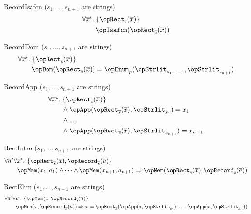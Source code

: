 \documentclass[11pt, a4paper, oneside]{article}
\begin{document}
\begin{axioms}
\item[RecordIsafcn (\rm$s_1,\dots,s_{n+1}$ are strings)] \[
        \begin{aligned}
            &\forall \overline{x}^\idv.\, \st{ \opRect_{\overline{s}}(\overline{x}) } \\
            &\qquad \opIsafcn(\opRect_{\overline{s}}(\overline{x}))
        \end{aligned}
    \]

\item[RecordDom (\rm$s_1,\dots,s_{n+1}$ are strings)] \[
        \begin{aligned}
            &\forall \overline{x}^\idv.\, \st{ \opRect_{\overline{s}}(\overline{x}) } \\
            &\qquad \opDom(\opRect_{\overline{s}}(\overline{x})) = \opEnum_p(\opStrlit_{s_1}, \dots, \opStrlit_{s_{n+1}})
        \end{aligned}
    \]

\item[RecordApp (\rm$s_1,\dots,s_{n+1}$ are strings)] \[
        \begin{aligned}
            &\forall \overline{x}^\idv.\, \st{ \opRect_{\overline{s}}(\overline{x}) } \\
            &\qquad \wedge \opApp(\opRect_{\overline{s}}(\overline{x}), \opStrlit_{s_1}) = x_1 \\
            &\qquad \wedge \dots \\
            &\qquad \wedge \opApp(\opRect_{\overline{s}}(\overline{x}), \opStrlit_{s_{n+1}}) = x_{n+1}
        \end{aligned}
    \]

\item[RectIntro (\rm$s_1,\dots,s_{n+1}$ are strings)] \[
        \begin{aligned}
            &\forall \overline{a}^\idv \forall \overline{x}^\idv.\, \st{ \opRect_{\overline{s}}(\overline{x}), \opRecord_{\overline{s}}(\overline{a}) } \\
            &\qquad \opMem(x_1, a_1) \wedge \dots \wedge \opMem(x_{n+1}, a_{n+1}) \imp \opMem(\opRect_{\overline{s}}(\overline{x}), \opRecord_{\overline{s}}(\overline{a}))
        \end{aligned}
    \]

\item[RectElim (\rm$s_1,\dots,s_{n+1}$ are strings)] \[
        \begin{aligned}
            &\forall \overline{a}^\idv \forall x^\idv.\, \st{ \opMem(x, \opRecord_{\overline{s}}(\overline{a}) } \\
            &\qquad \opMem(x, \opRecord_{\overline{s}}(\overline{a})) \imp x = \opRect_{\overline{s}}(\opApp(x, \opStrlit_{s_1}), \dots, \opApp(x, \opStrlit_{s_n}))
        \end{aligned}
    \]

\end{axioms}
\end{document}
